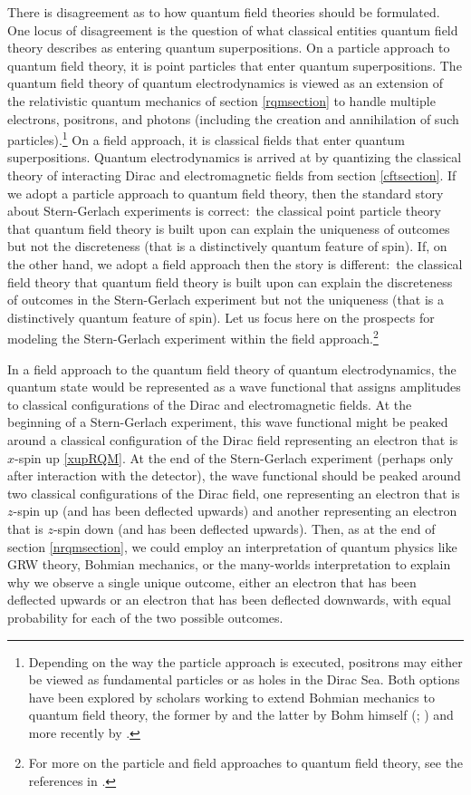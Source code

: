 \documentclass[12pt,secnumarabic,amsmath,amssymb,balancelastpage,nofootinbib]{article}
\begin{document}
There is disagreement as to how quantum field theories should be formulated.  One locus of disagreement is the question of what classical entities quantum field theory describes as entering quantum superpositions.  On a particle approach to quantum field theory, it is point particles that enter quantum superpositions.  The quantum field theory of quantum electrodynamics is viewed as an extension of the relativistic quantum mechanics of section \ref{rqmsection} to handle multiple electrons, positrons, and photons (including the creation and annihilation of such particles).\footnote{Depending on the way the particle approach is executed, positrons may either be viewed as fundamental particles or as holes in the Dirac Sea.  Both options have been explored by scholars working to extend Bohmian mechanics to quantum field theory, the former by \citet{durr2004, durr2005} and the latter by Bohm himself (\citealp[pg.\ 275]{bohm1953}; \citealp[ch.\ 12]{bohmhiley}) and more recently by \citet{colin2007, deckert2019}.}  On a field approach, it is classical fields that enter quantum superpositions.  Quantum electrodynamics is arrived at by quantizing the classical theory of interacting Dirac and electromagnetic fields from section \ref{cftsection}.  If we adopt a particle approach to quantum field theory, then the standard story about Stern-Gerlach experiments is correct:\ the classical point particle theory that quantum field theory is built upon can explain the uniqueness of outcomes but not the discreteness (that is a distinctively quantum feature of spin).  If, on the other hand, we adopt a field approach then the story is different:\ the classical field theory that quantum field theory is built upon can explain the discreteness of outcomes in the Stern-Gerlach experiment but not the uniqueness (that is a distinctively quantum feature of spin).  Let us focus here on the prospects for modeling the Stern-Gerlach experiment within the field approach.\footnote{For more on the particle and field approaches to quantum field theory, see the references in \citet[footnote 2]{howelectronsspin}.}


In a field approach to the quantum field theory of quantum electrodynamics, the quantum state would be represented as a wave functional that assigns amplitudes to classical configurations of the Dirac and electromagnetic fields.  At the beginning of a Stern-Gerlach experiment, this wave functional might be peaked around a classical configuration of the Dirac field representing an electron that is $x$-spin up \eqref{xupRQM}.  At the end of the Stern-Gerlach experiment (perhaps only after interaction with the detector), the wave functional should be peaked around two classical configurations of the Dirac field, one representing an electron that is $z$-spin up (and has been deflected upwards) and another representing an electron that is $z$-spin down (and has been deflected upwards).  Then, as at the end of section \ref{nrqmsection}, we could employ an interpretation of quantum physics like GRW theory, Bohmian mechanics, or the many-worlds interpretation to explain why we observe a single unique outcome, either an electron that has been deflected upwards or an electron that has been deflected downwards, with equal probability for each of the two possible outcomes.
\end{document}
